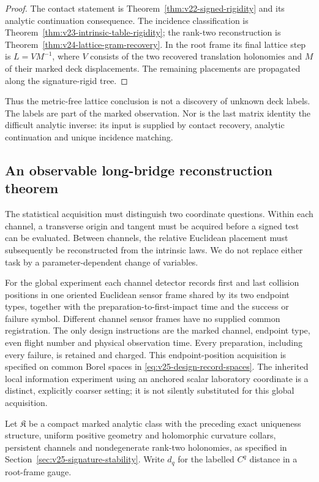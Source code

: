 \begin{proof}
The contact statement is Theorem~\ref{thm:v22-signed-rigidity} and its
analytic continuation consequence.  The incidence classification is
Theorem~\ref{thm:v23-intrinsic-table-rigidity}; the rank-two reconstruction
is Theorem~\ref{thm:v24-lattice-gram-recovery}.  In the root frame its final
lattice step is \(L=VM^{-1}\), where \(V\) consists of the two recovered
translation holonomies and \(M\) of their marked deck displacements.
The remaining placements are propagated along the signature-rigid tree.
\end{proof}

Thus the metric-free lattice conclusion is not a discovery of unknown deck
labels.  The labels are part of the marked observation.  Nor is the last
matrix identity the difficult analytic inverse: its input is supplied by
contact recovery, analytic continuation and unique incidence matching.

\subsection{An observable long-bridge reconstruction theorem}

The statistical acquisition must distinguish two coordinate questions.
Within each channel, a transverse origin and tangent must be acquired before
a signed test can be evaluated.  Between channels, the relative Euclidean
placement must subsequently be reconstructed from the intrinsic laws.
We do not replace either task by a parameter-dependent change of variables.

For the global experiment each channel detector records first and last
collision positions in one oriented Euclidean sensor frame shared by its
two endpoint types, together with the preparation-to-first-impact time and
the success or failure symbol.  Different channel sensor frames have no
supplied common registration.  The only design instructions are the marked
channel, endpoint type, even flight number and physical observation time.
Every preparation, including every failure, is retained and charged.
This endpoint-position acquisition is specified on common Borel spaces in
\eqref{eq:v25-design-record-spaces}.  The inherited local information
experiment using an anchored scalar laboratory coordinate is a distinct,
explicitly coarser setting; it is not silently substituted for this global
acquisition.

Let \(\mathfrak K\) be a compact marked analytic class with the preceding
exact uniqueness structure, uniform positive geometry and holomorphic
curvature collars, persistent channels and nondegenerate rank-two
holonomies, as specified in Section~\ref{sec:v25-signature-stability}.
Write \(d_q\) for the labelled \(C^q\) distance in a root-frame gauge.

